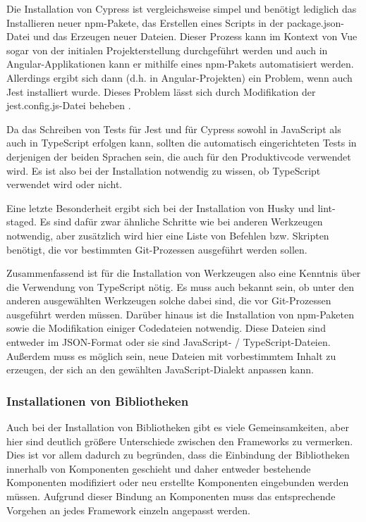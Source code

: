 Die Installation von Cypress ist vergleichsweise simpel und benötigt lediglich das Installieren neuer \gls{npm}-Pakete, das Erstellen eines Scripts in der package.json-Datei und das Erzeugen neuer Dateien. Dieser Prozess kann im Kontext von Vue sogar von der initialen Projekterstellung durchgeführt werden und auch in Angular-Applikationen kann er mithilfe eines \gls{npm}-Pakets automatisiert werden. Allerdings ergibt sich dann (d.h. in Angular-Projekten) ein Problem, wenn auch Jest installiert wurde. Dieses Problem lässt sich durch Modifikation der jest.config.js-Datei beheben \cite{angular_jest_cypress_issue}.

Da das Schreiben von Tests für Jest und für Cypress sowohl in JavaScript als auch in TypeScript erfolgen kann, sollten die automatisch eingerichteten Tests in derjenigen der beiden Sprachen sein, die auch für den Produktivcode verwendet wird. Es ist also bei der Installation notwendig zu wissen, ob TypeScript verwendet wird oder nicht.

Eine letzte Besonderheit ergibt sich bei der Installation von Husky und lint-staged. Es sind dafür zwar ähnliche Schritte wie bei anderen Werkzeugen notwendig, aber zusätzlich wird hier eine Liste von Befehlen bzw. Skripten benötigt, die vor bestimmten Git-Prozessen ausgeführt werden sollen.

Zusammenfassend ist für die Installation von Werkzeugen also eine Kenntnis über die Verwendung von TypeScript nötig. Es muss auch bekannt sein, ob unter den anderen ausgewählten Werkzeugen solche dabei sind, die vor Git-Prozessen ausgeführt werden müssen. Darüber hinaus ist die Installation von \gls{npm}-Paketen sowie die Modifikation einiger Codedateien notwendig. Diese Dateien sind entweder im \gls{JSON}-Format oder sie sind JavaScript- / TypeScript-Dateien. Außerdem muss es möglich sein, neue Dateien mit vorbestimmtem Inhalt zu erzeugen, der sich an den gewählten JavaScript-Dialekt anpassen kann.

\subsubsection{Installationen von Bibliotheken}
Auch bei der Installation von Bibliotheken gibt es viele Gemeinsamkeiten, aber hier sind deutlich größere Unterschiede zwischen den Frameworks zu vermerken. Dies ist vor allem dadurch zu begründen, dass die Einbindung der Bibliotheken innerhalb von Komponenten geschieht und daher entweder bestehende Komponenten modifiziert oder neu erstellte Komponenten eingebunden werden müssen. Aufgrund dieser Bindung an Komponenten muss das entsprechende Vorgehen an jedes Framework einzeln angepasst werden.

